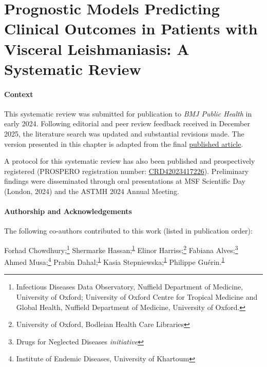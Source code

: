 
\chapter[Systematic Review of Prognostic Models]{\label{ch:2-sys-review}Prognostic Models Predicting Clinical Outcomes in Patients with Visceral Leishmaniasis: A Systematic Review}
\minitoc{}

\subsubsection{Context}

This systematic review was submitted for publication to \textit{BMJ Public Health} in early 2024. Following editorial and peer review feedback received in December 2025, the literature search was updated and substantial revisions made. The version presented in this chapter is adapted from the final \href{https://doi.org/10.1136/bmjph-2024-001196}{published article}\cite{wilson2026}.

A protocol for this systematic review has also been published\cite{wilsonPrognosticPredictionModels2023} and prospectively registered (PROSPERO registration number: \href{https://www.crd.york.ac.uk/PROSPERO/view/CRD42021284622}{CRD42023417226}). Preliminary findings were disseminated through oral presentations at MSF Scientific Day (London, 2024) and the ASTMH 2024 Annual Meeting.

\subsubsection{Authorship and Acknowledgements}

The following co-authors contributed to this work (listed in publication order):

Forhad Chowdhury;\footnote{Infectious Diseases Data Observatory, Nuffield Department of Medicine, University of Oxford; University of Oxford Centre for Tropical Medicine and Global Health, Nuffield Department of Medicine, University of Oxford.\label{fn:IDDO}} Shermarke Hassan;\textsuperscript{\ref{fn:IDDO}} Elinor Harriss;\footnote{University of Oxford, Bodleian Health Care Libraries} Fabiana Alves;\footnote{Drugs for Neglected Diseases \textit{initiative}} Ahmed Musa;\footnote{Institute of Endemic Diseases, University of Khartoum} Prabin Dahal;\textsuperscript{\ref{fn:IDDO}} Kasia Stepniewska;\textsuperscript{\ref{fn:IDDO}} Philippe Guérin.\textsuperscript{\ref{fn:IDDO}}

